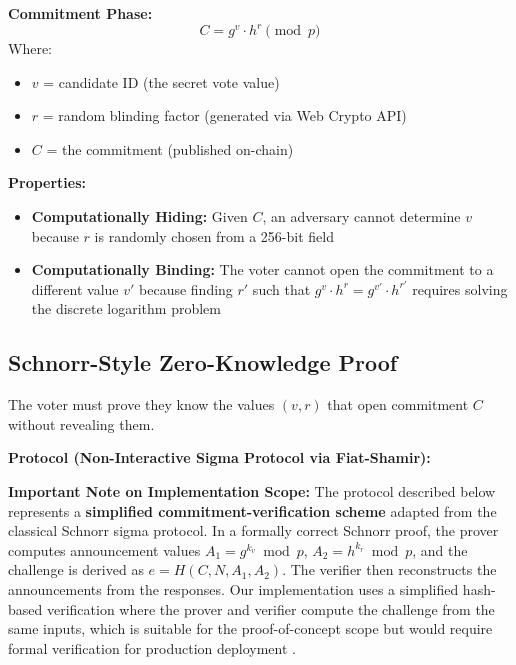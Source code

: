 \documentclass[oneside,a4paper,12pt]{book}
\begin{document}
\textbf{Commitment Phase:}
\[
C = g^v \cdot h^r \pmod{p}
\]
Where:
\begin{itemize}[leftmargin=1.5cm]
    \item $v$ = candidate ID (the secret vote value)
    \item $r$ = random blinding factor (generated via Web Crypto API)
    \item $C$ = the commitment (published on-chain)
\end{itemize}

\textbf{Properties:}
\begin{itemize}[leftmargin=1.5cm]
    \item \textbf{Computationally Hiding:} Given $C$, an adversary cannot determine $v$ because $r$ is randomly chosen from a 256-bit field
    \item \textbf{Computationally Binding:} The voter cannot open the commitment to a different value $v'$ because finding $r'$ such that $g^v \cdot h^r = g^{v'} \cdot h^{r'}$ requires solving the discrete logarithm problem
\end{itemize}

\subsection{Schnorr-Style Zero-Knowledge Proof}
The voter must prove they know the values $(v, r)$ that open commitment $C$ without revealing them.

\textbf{Protocol (Non-Interactive Sigma Protocol via Fiat-Shamir):}

\textbf{Important Note on Implementation Scope:} The protocol described below represents a \textbf{simplified commitment-verification scheme} adapted from the classical Schnorr sigma protocol. In a formally correct Schnorr proof, the prover computes announcement values $A_1 = g^{k_v} \bmod p$, $A_2 = h^{k_r} \bmod p$, and the challenge is derived as $e = H(C, N, A_1, A_2)$. The verifier then reconstructs the announcements from the responses. Our implementation uses a simplified hash-based verification where the prover and verifier compute the challenge from the same inputs, which is suitable for the proof-of-concept scope but would require formal verification for production deployment \cite{schnorr1991}.
\end{document}

